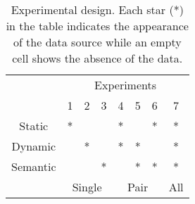 \begin{table}[h]
\centering
    \caption[Experimental design]{Experimental design. Each star (*) in the table indicates the appearance of the data source while an empty cell shows the absence of the data.}\label{tab:experimental_design}
    \begin{tabular}{c|c|c|c|c|c|c|c|}
        \cline{2-8}
        & \multicolumn{7}{c|}{Experiments}\\
        \cline{2-8}
        & 1 & 2 & 3 & 4 & 5 & 6 & 7 \\
        \hline
        \multicolumn{1}{|c|}{Static} & * & & & * & & * & *\\
        \hline
        \multicolumn{1}{|c|}{Dynamic} & & * & & * & * & & *\\
        \hline
        \multicolumn{1}{|c|}{Semantic} & & & * & & * & * & *\\
        \hline
        & \multicolumn{3}{c|}{Single} & \multicolumn{3}{c|}{Pair} &  \multicolumn{1}{c|}{All}\\
        \cline{2-8}
    \end{tabular}
\end{table}